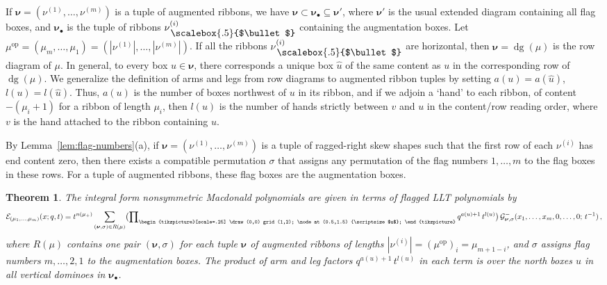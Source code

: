 \documentclass[12pt]{amsart}
\newtheorem{thm}{Theorem}[subsection]
\theoremstyle{definition}
\theoremstyle{remark}
\newcommand{\nubold}{{\boldsymbol \nu }}
\newcommand{\Ecal}{{\mathcal E}}
\newcommand{\Gcal}{{\mathcal G}}
\newcommand{\uhat}{\widehat{u}}
\newcommand{\baug}{\bullet }
\newcommand{\aug}{\raisebox{.12ex}{\scalebox{.5}{$\baug $}}}
\newcommand{\domino}{\begin{tikzpicture}[scale=.25]
\draw (0,0) grid (1,2);
\node at (0.5,1.5) {\scriptsize $u$};
\end{tikzpicture}}
\DeclareMathOperator{\dg}{dg}
\DeclareMathOperator{\op}{op}
\begin{document}
If $\nubold = (\nu ^{(1)},\ldots,\nu ^{(m)})$ is a tuple of augmented
ribbons, we have $\nubold \subset \nubold _{\baug } \subseteq \nubold
'$, where $\nubold '$ is the usual extended diagram containing all
flag boxes, and $\nubold _{\baug }$ is the tuple of ribbons $\nu
^{(i)}_{\, \aug }$ containing the augmentation boxes.  Let $ \mu
^{\op} = (\mu _{m},\ldots,\mu _{1}) = (|\nu ^{(1)}|,\ldots,|\nu
^{(m)}|)$.  If all the ribbons $\nu ^{(i)} _{\, \aug }$ are
horizontal, then $\nubold = \dg (\mu )$ is the row diagram of $\mu $.
In general, to every box $u\in \nubold $, there corresponds a unique
box $\uhat $ of the same content as $u$ in the corresponding row of
$\dg (\mu )$.  We generalize the definition of arms and legs from row
diagrams to augmented ribbon tuples by setting $a(u) = a(\uhat )$,
$l(u) = l(\uhat )$.  Thus, $a(u)$ is the number of boxes northwest of
$u$ in its ribbon, and if we adjoin a `hand' to each ribbon, of
content $-(\mu _{i}+1)$ for a ribbon of length $\mu _{i}$, then $l(u)$
is the number of hands strictly between $v$ and $u$ in the content/row
reading order, where $v$ is the hand attached to the ribbon containing
$u$.

By Lemma~\ref{lem:flag-numbers}(a), if $\nubold = (\nu ^{(1)},\ldots,
\nu ^{(m)})$ is a tuple of ragged-right skew shapes such that the
first row of each $\nu ^{(i)}$ has end content zero, then there exists
a compatible permutation $\sigma $ that assigns any permutation of the
flag numbers $1, \ldots, m$ to the flag boxes in these rows.  For a
tuple of augmented ribbons, these flag boxes are the augmentation
boxes.


\begin{thm}\label{thm:ns-HHL}
The integral form nonsymmetric Macdonald polynomials are given in
terms of flagged LLT polynomials by
\begin{equation}\label{e:ns-HHL}
\Ecal _{(\mu _{1},\ldots,\mu _{m})}(x;q,t) = t^{n(\mu _{+})} \sum
_{(\nubold ,\sigma )\in R(\mu )} \bigl( \prod \nolimits_{\domino }
q^{a(u)+1}\, t^{l(u)} \bigr)\, \Gcal _{\nubold ,\sigma
}^{-}(x_{1},\ldots,x_{m},0,\ldots,0;\, t^{-1})\, ,
\end{equation}
where $R(\mu )$ contains one pair $(\nubold ,\sigma )$ for each tuple
$\nubold $ of augmented ribbons of lengths $|\nu ^{(i)}| = (\mu
^{\op})_{i} = \mu _{m+1-i}$, and $\sigma $ assigns flag numbers
$m,\ldots,2,1$ to the augmentation boxes.  The product of arm and leg
factors $q^{a(u)+1}\, t^{l(u)}$ in each term is over the north boxes
$u$ in all vertical dominoes in $\nubold _{\baug }$.
\end{thm}
\end{document}
